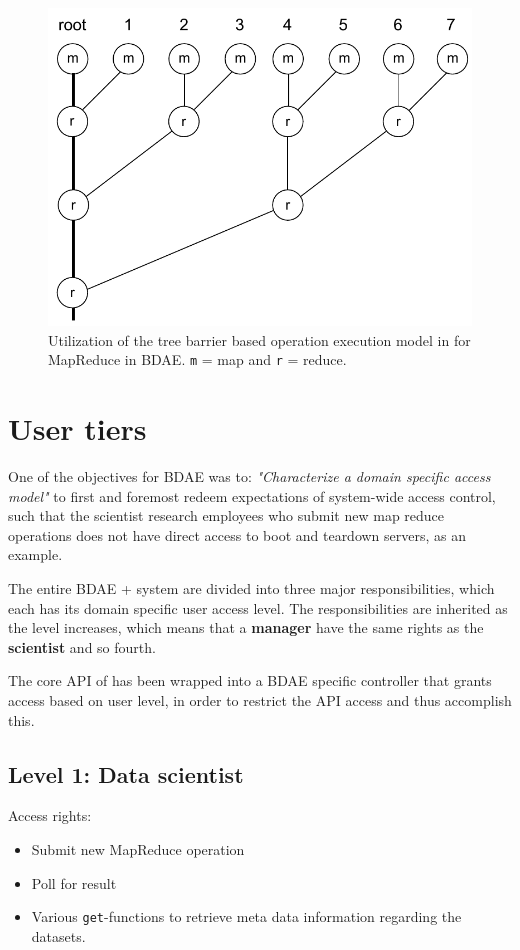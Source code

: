 \begin{figure}
	\centering
	\includegraphics[scale=0.7]{pdf/map-reduce-tree.pdf}
	\caption[BDAE MapReduce implementation]{Utilization of the tree barrier based operation execution model in \CodeName for MapReduce in BDAE. \texttt{m} = map and \texttt{r} = reduce. \label{fig:map-reduce-tree}}
\end{figure}	

\section{User tiers}
One of the objectives for BDAE was to: \textit{"Characterize a domain specific access model"} to first and foremost redeem expectations of system-wide access control, such that the scientist research employees who submit new map reduce operations does not have direct access to boot and teardown servers, as an example.
\newline

The entire BDAE + \CodeName system are divided into three major responsibilities, which each has its domain specific user access level. The responsibilities are inherited as the level increases, which means that a \textbf{manager} have the same rights as the \textbf{scientist} and so fourth.
\newline

The core API of \CodeName has been wrapped into a BDAE specific controller that grants access based on user level, in order to restrict the API access and thus accomplish this.

\subsection{Level 1: Data scientist}
Access rights:
\begin{itemize}
	\item Submit new MapReduce operation
	\item Poll for result
	\item Various \texttt{get}-functions to retrieve meta data information regarding the datasets.
\end{itemize}

